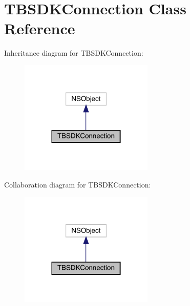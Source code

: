 \hypertarget{interface_t_b_s_d_k_connection}{}\section{T\+B\+S\+D\+K\+Connection Class Reference}
\label{interface_t_b_s_d_k_connection}


Inheritance diagram for T\+B\+S\+D\+K\+Connection\+:\nopagebreak
\begin{figure}[H]
\begin{center}
\leavevmode
\includegraphics[width=180pt]{interface_t_b_s_d_k_connection__inherit__graph}
\end{center}
\end{figure}


Collaboration diagram for T\+B\+S\+D\+K\+Connection\+:\nopagebreak
\begin{figure}[H]
\begin{center}
\leavevmode
\includegraphics[width=180pt]{interface_t_b_s_d_k_connection__coll__graph}
\end{center}
\end{figure}

